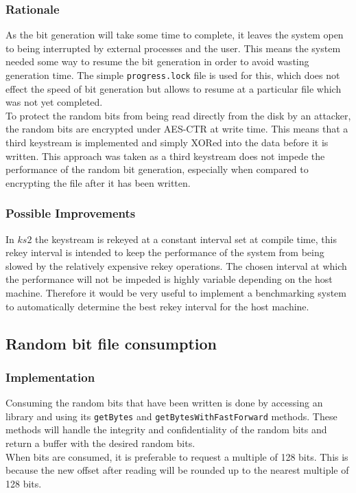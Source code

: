 \documentclass{paper}
\begin{document}
				\subsubsection{Rationale}
					As the bit generation will take some time to complete, it leaves the system open to being interrupted by external processes and the user. This means the system needed some way to resume the bit generation in order to avoid wasting generation time. The simple \texttt{progress.lock} file is used for this, which does not effect the speed of bit generation but allows to resume at a particular file which was not yet completed.\\
					
					To protect the random bits from being read directly from the disk by an attacker, the random bits are encrypted under AES-CTR at write time. This means that a third keystream is implemented and simply XORed into the data before it is written. This approach was taken as a third keystream does not impede the performance of the random bit generation, especially when compared to encrypting the file after it has been written.\\
				\subsubsection{Possible Improvements}
					In $\mathit{ks2}$ the keystream is rekeyed at a constant interval set at compile time, this rekey interval is intended to keep the performance of the system from being slowed by the relatively expensive rekey operations. The chosen interval at which the performance will not be impeded is highly variable depending on the host machine. Therefore it would be very useful to implement a benchmarking system to automatically determine the best rekey interval for the host machine.

			\subsection{Random bit file consumption}
				\subsubsection{Implementation}
					Consuming the random bits that have been written is done by accessing an library and using its \texttt{getBytes} and \texttt{getBytesWithFastForward} methods. These methods will handle the integrity and confidentiality of the random bits and return a buffer with the desired random bits.\\
					When bits are consumed, it is preferable to request a multiple of 128 bits. This is because the new offset after reading will be rounded up to the nearest multiple of 128 bits.\\
					
\end{document}
